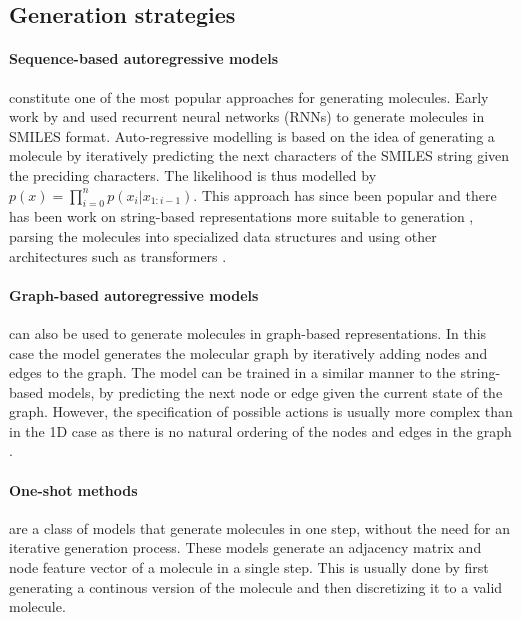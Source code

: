\subsection{Generation strategies}
\paragraph{Sequence-based autoregressive models} constitute one of the most popular approaches
for generating molecules. Early work by \citep{seglerGeneratingFocusedMolecule2018} and
\citep{gomez-bombarelliAutomaticChemicalDesign2018} used recurrent neural networks (RNNs) to generate
molecules in SMILES format. Auto-regressive modelling is based on the idea of generating a molecule
by iteratively predicting the next characters of the SMILES string given the preciding characters.
The likelihood is thus modelled by $p(x) = \prod_{i=0}^n p(x_i | x_{1:i-1})$.
This approach has since been popular and there has been work on string-based representations more
suitable to generation \citep{oboyleDeepSMILESAdaptationSMILES2018,krennSelfReferencingEmbeddedStrings2020},
parsing the molecules into specialized data structures \citep{kusnerGrammarVariationalAutoencoder2017,jinJunctionTreeVariational2018}
and using other architectures \citep{todo} such as transformers \citep{vaswaniAttentionAllYou2017}.

\paragraph{Graph-based autoregressive models} can also be used to generate molecules in graph-based
representations. In this case the model generates the molecular graph by iteratively adding nodes
and edges to the graph. The model can be trained in a similar manner to the string-based models, by
predicting the next node or edge given the current state of the graph. However, the specification of
possible actions is usually more complex than in the 1D case as there is no natural ordering of the
nodes and edges in the graph \citep{}.

\paragraph{One-shot methods} are a class of models that generate molecules in one step, without the
need for an iterative generation process. These models generate an adjacency matrix and node feature
vector of a molecule in a single step. This is usually done by first generating a continous
version of the molecule and then discretizing it to a valid molecule. \citep{}

